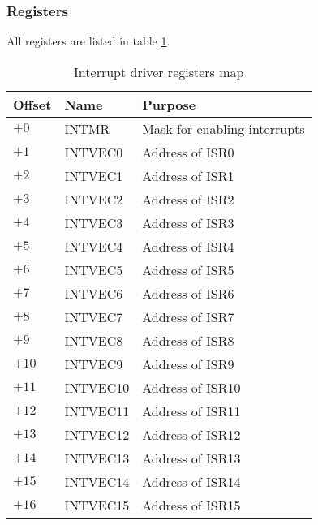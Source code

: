 \subsubsection{Registers}

All registers are listed in table \ref{tab:int_driver_reg_map}.

\begin{table}[H]
    \centering
    \begin{tabular}{|l|l|l|}
        \hline
        \textbf{Offset} & \textbf{Name} & \textbf{Purpose}             \\ \hline
        $+0$            & INTMR         & Mask for enabling interrupts \\ \hline
        $+1$            & INTVEC0       & Address of ISR0              \\ \hline
        $+2$            & INTVEC1       & Address of ISR1              \\ \hline
        $+3$            & INTVEC2       & Address of ISR2              \\ \hline
        $+4$            & INTVEC3       & Address of ISR3              \\ \hline
        $+5$            & INTVEC4       & Address of ISR4              \\ \hline
        $+6$            & INTVEC5       & Address of ISR5              \\ \hline
        $+7$            & INTVEC6       & Address of ISR6              \\ \hline
        $+8$            & INTVEC7       & Address of ISR7              \\ \hline
        $+9$            & INTVEC8       & Address of ISR8              \\ \hline
        $+10$           & INTVEC9       & Address of ISR9              \\ \hline
        $+11$           & INTVEC10      & Address of ISR10             \\ \hline
        $+12$           & INTVEC11      & Address of ISR11             \\ \hline
        $+13$           & INTVEC12      & Address of ISR12             \\ \hline
        $+14$           & INTVEC13      & Address of ISR13             \\ \hline
        $+15$           & INTVEC14      & Address of ISR14             \\ \hline
        $+16$           & INTVEC15      & Address of ISR15             \\ \hline
    \end{tabular}
    \caption{Interrupt driver registers map}
    \label{tab:int_driver_reg_map}
\end{table}

